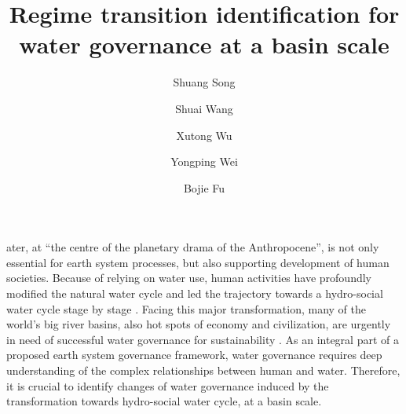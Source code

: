 \documentclass[9pt, twocolumn, twoside, lineno]{pnas-new}
\title{Regime transition identification for water governance at a basin scale}
\author[a, b]{Shuang Song}  %
\author[a, b]{Shuai Wang}  %
\author[c, d]{Xutong Wu}  %
\author[e]{Yongping Wei} %
\author[a, b, 1]{Bojie Fu}  %
\affil[a]{ %
	State Key Laboratory of Earth Surface Processes and Resource Ecology, 
	Faculty of Geographical Science, 
	Beijing Normal University, 
	Beijing 100875, 
	P.R. China
}
\affil[b]{ %
	Institute of Land Surface System and Sustainability, 
	Faculty of Geographical Science, 
	Beijing Normal University, 
	Beijing 100875, 
	P.R. China
}
\affil[c]{ %
	College of Urban and Environmental Sciences, 
	Peking University, 
	Beijing 100871, 
	P.R. China
}
\affil[d]{ %
	State Key Laboratory of Urban and Regional Ecology, 
	Research Center for Eco-Environmental Sciences, 
	Chinese Academy of Sciences, 
	Beijing 100085, 
	P.R. China 
}
\affil[e]{ %
	School of Earth and Environmental Sciences, 
	The University of Queensland, 
	Brisbane 4067, 
	Australia
}
\begin{document}
\maketitle
\thispagestyle{firststyle}

\label{introduction-section-1}
ater, at “the centre of the planetary drama of the Anthropocene”, is not only essential for earth system processes, but also supporting development of human societies. 
Because of relying on water use, human activities have profoundly modified the natural water cycle and led the trajectory towards a hydro-social water cycle stage by stage
\cite{gleesonIlluminatingWaterCycle2020,cummingLinkingEconomicGrowth2018}.
Facing this major transformation, many of the world's big river basins, also hot spots of economy and civilization, are urgently in need of successful water governance for sustainability
\cite{bestAnthropogenicStressesWorld2019}. 
As an integral part of a proposed earth system governance framework, water governance requires deep understanding of the complex relationships between human and water.
Therefore, it is crucial to identify changes of water governance induced by the transformation towards hydro-social water cycle, at a basin scale.
\end{document}
